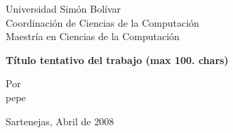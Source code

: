 \documentclass{article}
\begin{document}

\thispagestyle{empty}

\textsf{
Universidad Simón Bolívar \\
Coordinación de Ciencias de la Computación \\
Maestría en Ciencias de la Computación \\
}

\begin{center}

{\large \bf \textsf{Título tentativo del trabajo (max 100. chars)}}

\end{center}

\vspace{5.0cm}

\textsf{
Por \\
pepe \\
}

\vspace{\fill}

\vspace{\fill}

\vspace{1.0cm}
\textsf{Sartenejas, Abril de 2008}
\end{document}
